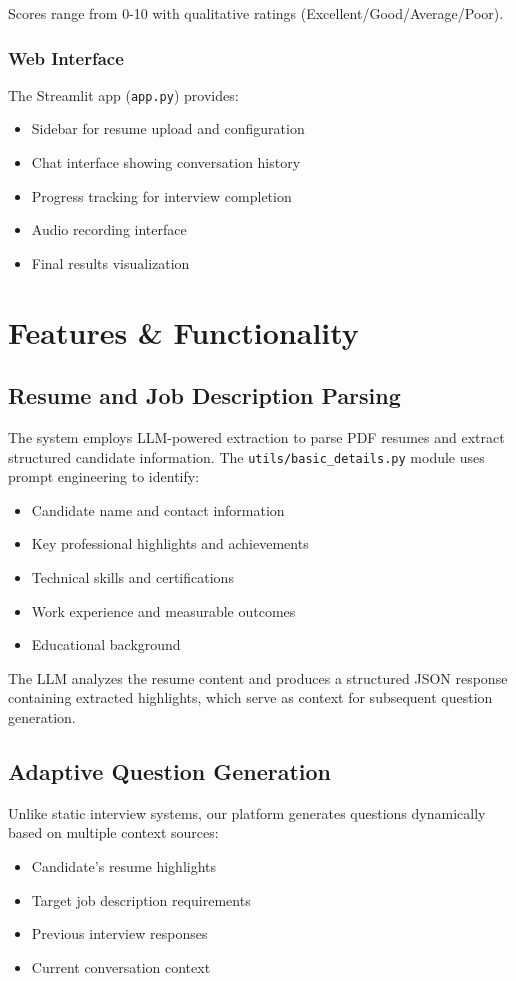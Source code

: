 \documentclass[conference]{IEEEtran}
\begin{document}
Scores range from 0-10 with qualitative ratings (Excellent/Good/Average/Poor).

\subsubsection{Web Interface}
The Streamlit app (\texttt{app.py}) provides:
\begin{itemize}
\item Sidebar for resume upload and configuration
\item Chat interface showing conversation history
\item Progress tracking for interview completion
\item Audio recording interface
\item Final results visualization
\end{itemize}

\section{Features \& Functionality}

\subsection{Resume and Job Description Parsing}
The system employs LLM-powered extraction to parse PDF resumes and extract structured candidate information. The \texttt{utils/basic\_details.py} module uses prompt engineering to identify:
\begin{itemize}
\item Candidate name and contact information
\item Key professional highlights and achievements
\item Technical skills and certifications
\item Work experience and measurable outcomes
\item Educational background
\end{itemize}

The LLM analyzes the resume content and produces a structured JSON response containing extracted highlights, which serve as context for subsequent question generation.

\subsection{Adaptive Question Generation}
Unlike static interview systems, our platform generates questions dynamically based on multiple context sources:
\begin{itemize}
\item Candidate's resume highlights
\item Target job description requirements
\item Previous interview responses
\item Current conversation context
\end{itemize}
\end{document}
